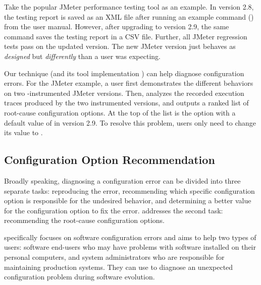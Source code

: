 Take the popular JMeter performance testing tool as an example.
In version 2.8, the testing report is saved as an XML
file after running an example command ()
from the user manual.
However, after upgrading to version 2.9, 
the same command saves the testing report
in a CSV file. Further, all JMeter regression tests pass 
on the updated version.  The new JMeter version
just behaves as \textit{designed} but \textit{differently}
than a user was expecting.



Our technique (and its tool implementation \ourtool) can help
diagnose configuration errors. For the JMeter example,
a user first demonstrates the different
behaviors on two \ourtool-instrumented
JMeter versions. Then, \ourtool analyzes the
recorded execution traces produced by the two instrumented
versions, and outputs a ranked list of root-cause configuration options.
At the top of the list is the
 option with a default value of 
in version 2.9.
To resolve this problem, users only need to change
its value to .

\vspace{-1mm}

\subsection{Configuration Option Recommendation}

Broadly speaking, diagnosing a configuration
error can be divided into three separate tasks:
reproducing the error, recommending which specific
configuration option is responsible for the undesired
behavior, and determining a better value for the
configuration option to fix the error. \ourtool addresses
the second task: recommending the root-cause configuration options.

\ourtool specifically focuses on software configuration errors and
aims to help two types of users: software end-users
who may have problems with software installed on their
personal computers, and system administrators who are
responsible for maintaining production systems.
They can use \ourtool to diagnose an unexpected configuration
problem during software evolution. 

